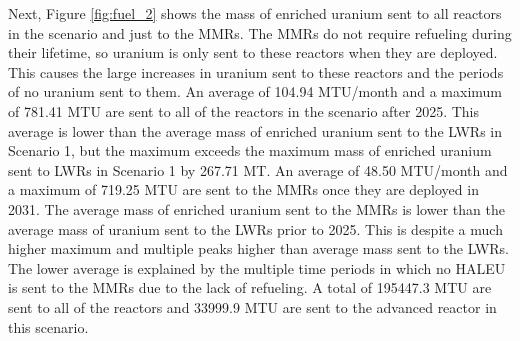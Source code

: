 Next, Figure \ref{fig:fuel_2} shows the mass of enriched uranium sent to all 
reactors in the scenario and just to the \glspl{MMR}. The \glspl{MMR} 
do not require refueling during their lifetime, so uranium is only 
sent to these reactors when they are deployed. This causes the 
large increases in uranium sent to these reactors and the periods of 
no uranium sent to them. An average of 104.94 MTU/month and a maximum 
of 781.41 MTU are sent to all of the reactors in the scenario after 2025. 
This average is lower than the average mass of enriched uranium 
sent to the \glspl{LWR} in Scenario 1, but the maximum exceeds the maximum 
mass of enriched uranium sent to \glspl{LWR} in Scenario 1 by 267.71 MT.
An average of 48.50 MTU/month and a maximum of 719.25 
MTU are sent to the \glspl{MMR} once they are deployed in 2031. The average 
mass of enriched uranium sent to the 
\glspl{MMR} is lower than the average mass of uranium sent to the \glspl{LWR}
prior to 2025. This is despite a much higher maximum and multiple peaks higher
than
average mass sent to the \glspl{LWR}. The lower average is explained by the 
multiple time periods in 
which no \gls{HALEU} is sent to the \glspl{MMR} due to the lack of refueling.
A total of 195447.3 MTU are sent to all of the reactors and 
33999.9 MTU are sent to the advanced reactor in this 
scenario. 

